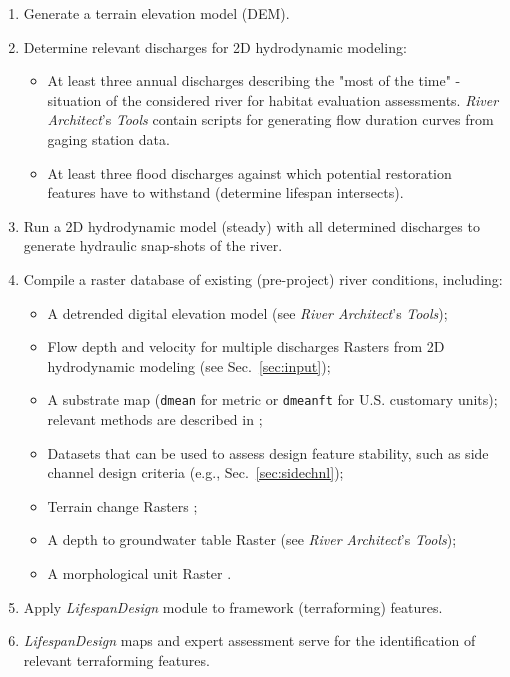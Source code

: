 \begin{enumerate}
	\item Generate a terrain elevation model (DEM).
	\item Determine relevant discharges for 2D hydrodynamic modeling:
	\begin{itemize}
	  \item At least three annual discharges describing the "most of the time" - situation of the considered river for habitat evaluation assessments. \textit{River Architect}'s \textit{Tools} contain scripts for generating flow duration curves from gaging station data.
	  \item At least three flood discharges against which potential restoration features have to withstand (determine lifespan intersects).
	\end{itemize}
	\item Run a 2D hydrodynamic model (steady) with all determined discharges to generate hydraulic snap-shots of the river.
	\item Compile a raster database of existing (pre-project) river conditions, including:
	\begin{itemize}
		\item A	detrended digital elevation model (see \textit{River Architect}'s \textit{Tools});
		\item Flow depth and velocity for multiple discharges Rasters from 2D hydrodynamic modeling (see Sec.~\ref{sec:input});
		\item A substrate map (\texttt{dmean} for metric or \texttt{dmean{\myUnderscore}ft} for U.S. customary units); relevant methods are described in \citet{detert18, staehly17, jackson13}; 
		\item Datasets that can be used to assess design feature stability, such as side channel design criteria (e.g., Sec.~\ref{sec:sidechnl});
		\item Terrain change Rasters \citep[Topographic Change Detection or DEM differencing according to][]{wyrick16};
		\item A depth to groundwater table Raster (see \textit{River Architect}'s \textit{Tools});
		\item A morphological unit Raster \citep[see \textit{River Architect}'s \textit{Tools} applying methods from][]{wyrick14b}.
	\end{itemize}
	\item Apply \textit{LifespanDesign} module to framework (terraforming) features.
	\item \textit{LifespanDesign} maps and expert assessment serve for the identification of relevant terraforming features.

\end{enumerate}
